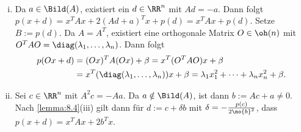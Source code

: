 \begin{beweis}
	\mbox{} \\[-.9cm]
	\begin{enumerate}[(i)]
		\item Da $a \in \Bild(A)$, existiert ein $d \in \RR^n$ mit $Ad = -a$.
		Dann folgt $p(x+d) = x^TAx + 2(Ad+a)^Tx + p(d) = x^T Ax + p(d)$.
		Setze $B := p(d)$.
		Da $A = A^T$, existiert eine orthogonale Matrix $O \in \oh(n)$ mit $O^TAO = \diag(\lambda_1,\dots,\lambda_n)$.
		Dann folgt
		\begin{align*}
			p(Ox+d) &= (Ox)^TA(Ox) + \beta = x^T(O^TAO)x + \beta \\
			&= x^T(\diag(\lambda_1,\dots,\lambda_n))x + \beta = \lambda_1 x_1^2 + \dots + \lambda_n x_n^2 + \beta.
		\end{align*}
		\item Sei $c \in \RR^n$ mit $A^2c = -Aa$.
		Da $a \notin \Bild(A)$, ist dann $b := Ac + a \neq 0$.
		Nach \autoref{lemma:8.4}(iii) gilt dann für $d := c + \delta b$ mit $\delta = - \frac{p(c)}{2 \no{b}^2}$, dass $p(x+d) = x^TAx + 2b^Tx$.


\end{enumerate}
\end{beweis}
